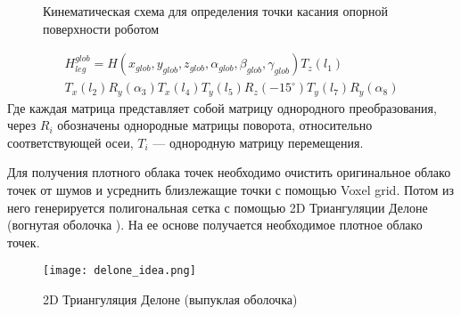 \begin{figure}[ht!]
    \caption{Кинематическая схема для определения точки касания опорной поверхности роботом}
    \label{fig:StriRus_10_legs_15_angle_v4.png}
\end{figure}

\begin{multline}
    \label{eq:forw_kin}
        H_{leg}^{glob} = H(x_{glob},y_{glob},z_{glob},\alpha_{glob},\beta_{glob},\gamma_{glob})T_z(l_1)\\ T_x(l_2)R_y(\alpha_3)T_x(l_4)T_y(l_5)R_z(-15^{\circ})T_y(l_7)R_y(\alpha_8)
\end{multline}
Где каждая матрица представляет собой матрицу однородного преобразования, через $R_i$ обозначены однородные матрицы поворота, относительно соответствующей осеи, $T_i$ --- однородную матрицу перемещения.

Для получения плотного облака точек необходимо очистить оригинальное облако точек от шумов и усреднить близлежащие точки с помощью Voxel grid. Потом из него генерируется полигональная сетка с помощью 2D Триангуляции Делоне  (вогнутая оболочка ). На ее основе получается необходимое плотное облако точек. 

\begin{figure}[ht!]
    \centering\texttt{[image: delone\_idea.png]}
    \caption{2D Триангуляция Делоне (выпуклая оболочка)}
    \label{fig:delone_idea.png}
\end{figure}

